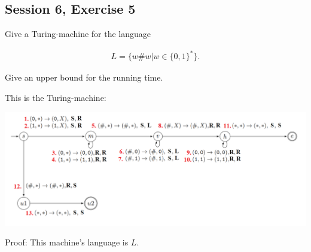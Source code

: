 \subsection {Session 6, Exercise 5}

\label{6_5}


Give a Turing-machine for the language

\begin{align*}
 L = \{w\#w | w \in{} \{0,1\}^*\}.
\end{align*}

Give an upper bound for the running time.


This is the Turing-machine:

\includegraphics[width=\linewidth]{06/6_5.png}

Proof: This machine's language is $L$.

